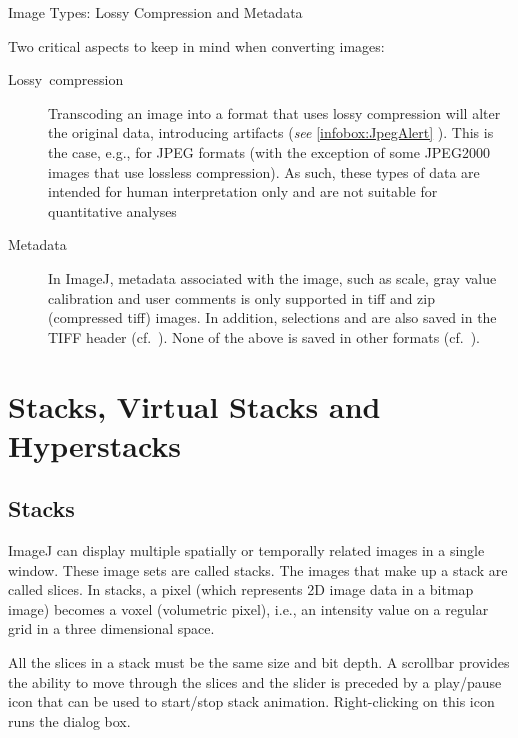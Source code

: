 \begin{infobox}
\caption{\label{infobox:Formats}Image Types: Lossy Compression and Metadata}


\noindent Two critical aspects to keep in mind when converting images:
\begin{description}
\item [{\label{misc:LossyCompression}Lossy\ compression}] Transcoding
an image into a format that uses lossy compression
will alter the original data, introducing artifacts (\emph{see} \ref{infobox:JpegAlert}
). This is the case, e.g., for JPEG formats
(with the exception of some JPEG2000
images that use lossless compression). As such, these types of data
are intended for human interpretation only and are not suitable for
quantitative analyses
\item [{\label{misc:Metadata}Metadata}] In ImageJ, metadata
associated with the image, such as scale, gray value calibration and
user comments is only supported in tiff and zip (compressed tiff)
images. In addition, selections and  are
also saved in the TIFF header (cf.\ \textsf{}).
None of the above is saved in other formats (cf.\ ).\end{description}
\end{infobox}



\section{Stacks, Virtual Stacks and Hyperstacks\label{sec:StacksVirtualStacksHyperStks}}


\subsection*{Stacks\label{sub:Stacks-Intro}}

ImageJ can display multiple spatially or temporally related images
in a single window. These image sets are called stacks. The images
that make up a stack are called slices. In stacks,
a pixel (which represents 2D image data in a bitmap image) becomes
a voxel (volumetric pixel),
i.e., an intensity value on a regular grid in a three dimensional
space. 

All the slices in a stack must be the same size and bit depth. A scrollbar
provides the ability to move through the slices and the slider is
preceded by a play/pause icon that can be used to start/stop stack
animation. Right-clicking on this icon runs the 
dialog box.

